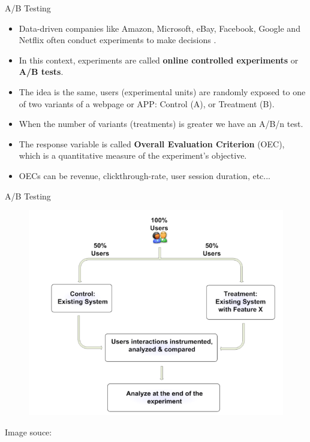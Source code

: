 \documentclass[handout]{beamer}
\begin{document}
\begin{frame}{A/B Testing}
\scriptsize{


\begin{itemize}

\item Data-driven companies like Amazon, Microsoft, eBay, Facebook, Google and Netflix often conduct experiments to make decisions \cite{kohavi2012trustworthy}.

\item In this context, experiments are called \textbf{online  controlled experiments} or \textbf{A/B tests}. 
 

 \item The idea is the same, users (experimental units) are randomly exposed to one of two variants of a webpage or APP: Control (A), or Treatment (B).
 
 \item When the number of variants (treatments) is greater we have an A/B/n test.
 
 \item The response variable is called \textbf{Overall  Evaluation  Criterion} (OEC), which is  a  quantitative measure of the experiment's objective. 
 
 \item OECs can be revenue, clickthrough-rate, user session duration, etc...
 \end{itemize}

} 
\end{frame}


\begin{frame}{A/B Testing}

 \begin{figure}[h!]
	\centering
	\includegraphics[scale=0.34]{pics/abtest.png}
\end{figure}
Image souce: \cite{kohavi2012trustworthy} 
\end{frame}
\end{document}
